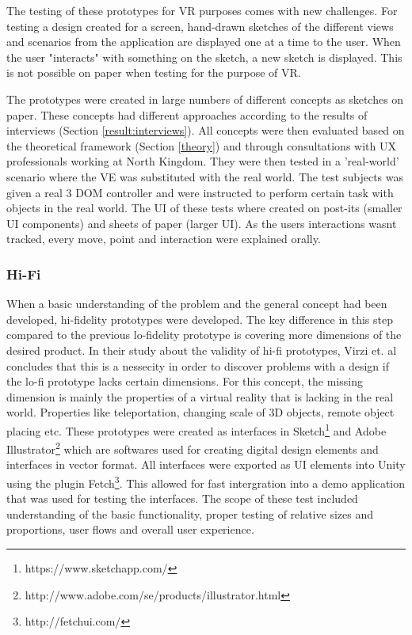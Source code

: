 The testing of these prototypes for VR purposes comes with new challenges. For testing a design created for a screen, hand-drawn sketches of the different views and scenarios from the application are displayed one at a time to the user. When the user "interacts" with something on the sketch, a new sketch is displayed\cite{proto:boling1997holistic}. This is not possible on paper when testing for the purpose of VR.

The prototypes were created in large numbers of different concepts as sketches on paper. These concepts had different approaches according to the results of interviews (Section \ref{result:interviews}). All concepts were then evaluated based on the theoretical framework (Section \ref{theory}) and through consultations with UX professionals working at North Kingdom. They were then tested in a 'real-world' scenario where the VE was substituted with the real world. The test subjects was given a real 3 DOM controller and were instructed to perform certain task with objects in the real world. The UI of these tests where created on post-its (smaller UI components) and sheets of paper (larger UI). As the users interactions wasnt tracked, every move, point and interaction were explained orally.
\subsubsection{Hi-Fi}
\label{method:prototype:hifi}
When a basic understanding of the problem and the general concept had been developed, hi-fidelity prototypes were developed. The key difference in this step compared to the previous lo-fidelity prototype is covering more dimensions of the desired product. In their study about the validity of hi-fi prototypes, Virzi et. al concludes that this is a nessecity in order to discover problems with a design if the lo-fi prototype lacks certain dimensions\cite{proto:virzi1996usability}. For this concept, the missing dimension is mainly the properties of a virtual reality that is lacking in the real world. Properties like teleportation, changing scale of 3D objects, remote object placing etc.
These prototypes were created as interfaces in  Sketch\footnote{https://www.sketchapp.com/} and Adobe Illustrator\footnote{http://www.adobe.com/se/products/illustrator.html} which are softwares used for creating digital design elements and interfaces in vector format. All interfaces were exported as UI elements into Unity using the plugin Fetch\footnote{http://fetchui.com/}. This allowed for fast intergration into a demo application that was used for testing the interfaces. The scope of these test included understanding of the basic functionality, proper testing of relative sizes and proportions, user flows and overall user experience.
